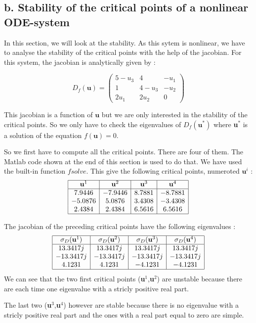 \subsection*{b. Stability of the critical points of a nonlinear ODE-system}

In this section, we will look at the stability. As this sytem is nonlinear, we have to analyse the stability of the critical points with the help of the jacobian. For this system, the jacobian is analytically given by : 

$$D_f(\textbf{u}) = \left(\begin{array}{ccc}
5-u_3 & 4 & -u_1 \\ 
1 & 4-u_3 & -u_2 \\ 
2u_1 & 2u_2 & 0
\end{array} \right)$$

This jacobian is a function of $\textbf{u}$ but we are only interested in the stability of the critical points. So we only have to check the eigenvalues of $D_f(\textbf{u}^*)$ where \textbf{u$^*$} is a solution of the equation $f(\textbf{u})=0$.

So we first have to compute all the critical points. There are four of them. The Matlab code shown at the end of this section is used to do that. We have used the built-in function $fsolve$. This give the following critical points, numeroted $\textbf{u}^i$ : 
$$\begin{array}{|c|c|c|c|}
\hline
\textbf{u}^1 & \textbf{u}^2 & \textbf{u}^3 & \textbf{u}^4 \\ 
\hline
7.9446 & -7.9446 & 8.7881 & -8.7881 \\ 
-5.0876 & 5.0876 & 3.4308 & -3.4308 \\ 
2.4384 & 2.4384 & 6.5616 & 6.5616\\
\hline
\end{array} $$

The jacobian of the preceding critical points have the following eigenvalues : 
$$\begin{array}{|c|c|c|c|}
\hline
\sigma_D(\textbf{u}^1) & \sigma_D(\textbf{u}^2) & \sigma_D(\textbf{u}^3) & \sigma_D(\textbf{u}^4) \\ 
\hline
13.3417j & 13.3417j & 13.3417j & 13.3417j \\ 
-13.3417j & -13.3417j & -13.3417j & -13.3417j \\ 
4.1231 & 4.1231 & -4.1231 & -4.1231\\
\hline
\end{array} $$
We can see that the two first critical points (\textbf{u}$^1$,\textbf{u}$^2$) are unstable because there are each time one eigenvalue with a stricly positive real part.

The last two (\textbf{u}$^3$,\textbf{u}$^4$) however are stable because there is no eigenvalue with a stricly positive real part and the ones with a real part equal to zero are simple.

